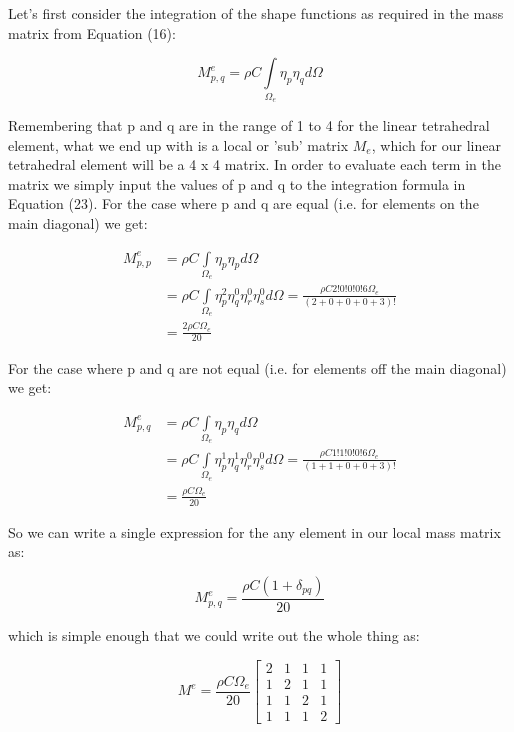 \documentclass[12pt]{article}
\begin{document}
Let's first consider the integration of the shape functions as required in the mass matrix from Equation (16):

$$
M_{p,q}^e = \rho C \int\limits_{\Omega_e} \eta_p \eta_q d\Omega
$$

Remembering that p and q are in the range of 1 to 4 for the linear tetrahedral element,
what we end up with is a local or 'sub' matrix $M_e$, which for our linear tetrahedral
element will be a 4 x 4 matrix. In order to evaluate each term in the matrix we
simply input the values of p and q to the integration formula in Equation (23). For
the case where p and q are equal (i.e. for elements on the main diagonal) we get:

\begin{align*}
 M_{p,p}^e & = \rho C  \int\limits_{\Omega_e} \eta_p \eta_p d\Omega \\
              	& = \rho C \int\limits_{\Omega_e} \eta_p^2 \eta_q^0 \eta_r^0 \eta_s^0 d{\Omega}=
 \frac{\rho C 2!0!0!0!6\Omega_e}{(2+0+0+0+3)!} \\
 				& = \frac{2\rho C \Omega_e}{20}
\end{align*}

For the case where p and q are not equal (i.e. for elements off the main diagonal) we get:

\begin{align*}
 M_{p,q}^e & = \rho C \int\limits_{\Omega_e} \eta_p \eta_q d\Omega \\
              	& = \rho C \int\limits_{\Omega_e} \eta_p^1 \eta_q^1 \eta_r^0 \eta_s^0 d{\Omega}=
 \frac{\rho C 1!1!0!0!6\Omega_e}{(1+1+0+0+3)!} \\
 				& = \frac{\rho C \Omega_e}{20}
\end{align*}

So we can write a single expression for the any element in our local mass matrix as:

$$
M_{p,q}^e = \frac{\rho C (1+\delta_{pq})}{20}
$$

which is simple enough that we could write out the whole thing as:

\begin{equation}
M^e = \frac{\rho C \Omega_e}{20}{\begin{bmatrix} 2 & 1 & 1 & 1 \\ 1 & 2 & 1 & 1 \\ 1 & 1 & 2 & 1 \\ 1 & 1 & 1 & 2 \end{bmatrix}}
\end{equation}
\end{document}
